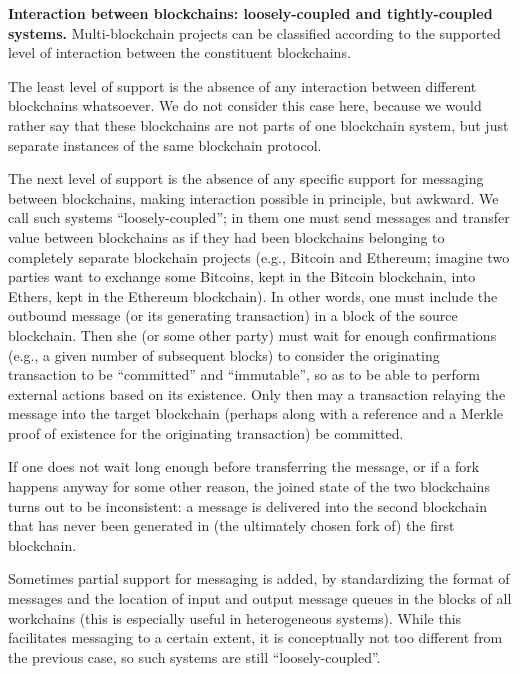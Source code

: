 \documentclass[12pt,oneside]{article}
\def\makepoint#1{\medbreak\noindent{\bf #1.\ }}
\def\nxsubpoint{\refstepcounter{subsubsection}%
  \smallbreak\makepoint{\thesubsubsection}}
\def\embt(#1.){\textbf{#1.}}
\begin{document}
\nxsubpoint\label{sp:blkch.interact} \embt(Interaction between
blockchains: loosely-coupled and tightly-coupled systems.)
Multi-blockchain projects can be classified according to the supported
level of interaction between the constituent blockchains.

The least level of support is the absence of any interaction between
different blockchains whatsoever. We do not consider this case here,
because we would rather say that these blockchains are not parts of
one blockchain system, but just separate instances of the same
blockchain protocol.

The next level of support is the absence of any specific support for
messaging between blockchains, making interaction possible in
principle, but awkward. We call such systems ``loosely-coupled''; in
them one must send messages and transfer value between blockchains as
if they had been blockchains belonging to completely separate
blockchain projects (e.g., Bitcoin and Ethereum; imagine two parties
want to exchange some Bitcoins, kept in the Bitcoin blockchain, into
Ethers, kept in the Ethereum blockchain). In other words, one must
include the outbound message (or its generating transaction) in a
block of the source blockchain. Then she (or some other party) must
wait for enough confirmations (e.g., a given number of subsequent
blocks) to consider the originating transaction to be ``committed''
and ``immutable'', so as to be able to perform external actions based
on its existence. Only then may a transaction relaying the message
into the target blockchain (perhaps along with a reference and a
Merkle proof of existence for the originating transaction) be
committed.

If one does not wait long enough before transferring the message, or
if a fork happens anyway for some other reason, the joined state of
the two blockchains turns out to be inconsistent: a message is
delivered into the second blockchain that has never been generated in
(the ultimately chosen fork of) the first blockchain.

Sometimes partial support for messaging is added, by standardizing the
format of messages and the location of input and output message queues
in the blocks of all workchains (this is especially useful in
heterogeneous systems). While this facilitates messaging to a certain
extent, it is conceptually not too different from the previous case,
so such systems are still ``loosely-coupled''.
\end{document}

